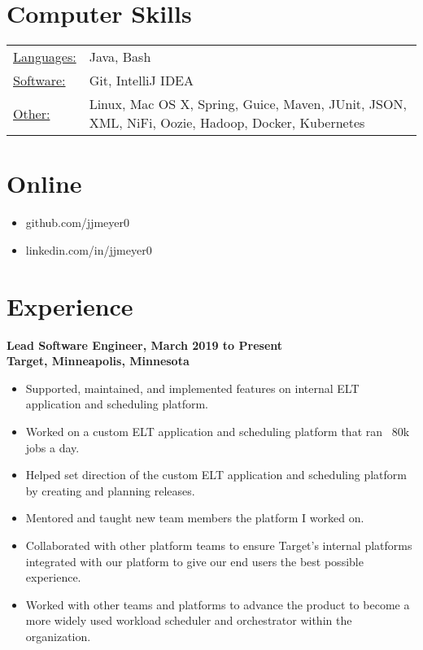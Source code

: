 \documentclass[margin]{res}
\begin{document}

\address{{\bf Contact Information}\\jjmeyer0@gmail.com}
\address{{\bf } \\}

\begin{resume} 

\section{Computer Skills}
\begin{tabular}{l p{4in}}
  \underline{Languages:} & Java, Bash\\
  \underline{Software:} & Git, IntelliJ IDEA \\
  \underline{Other:} & Linux, Mac OS X, Spring, Guice, Maven, JUnit, JSON, XML, NiFi, Oozie, Hadoop, Docker, Kubernetes
\end{tabular}

\section{Online}
\begin{itemize} \itemsep -2pt
\item github.com/jjmeyer0
\item linkedin.com/in/jjmeyer0
\end{itemize}

\section{Experience}
 {\bf Lead Software Engineer, March 2019 to Present\\
 Target, Minneapolis, Minnesota}
 \begin{itemize} \itemsep -2pt
 \item Supported, maintained, and implemented features on internal ELT application and scheduling platform.
 \item Worked on a custom ELT application and scheduling platform that ran ~80k jobs a day.
 \item Helped set direction of the custom ELT application and scheduling platform by creating and planning releases.
 \item Mentored and taught new team members the platform I worked on.
 \item Collaborated with other platform teams to ensure Target's internal platforms integrated with our platform to give our end users the best possible experience.
 \item Worked with other teams and platforms to advance the product to become a more widely used workload scheduler and orchestrator within the organization.
 \end{itemize}
 

\end{resume}
\end{document}
